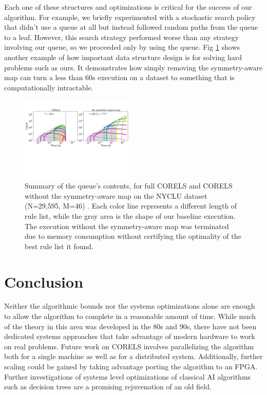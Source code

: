 \documentclass[format=sigconf]{acmart}
\begin{document}
Each one of these structures and optimizations is critical for the success of our algorithm.
For example, we briefly experimented with a stochastic search policy that didn't use a queue at all but instead followed random paths from the queue to a leaf.
However, this search strategy performed worse than any strategy involving our queue, so we proceeded only by using the queue.
Fig \ref{fig:ablation} shows another example of how important data structure design is for solving hard problems such as ours.
It demonstrates how simply removing the symmetry-aware map can turn a less than 60s execution on a dataset to something that is computationally intractable.

\begin{figure}[t!]
\begin{center}
\includegraphics[trim={4mm 0mm 0mm 0mm}, width=0.48\textwidth]{figs/sysml_ablation-queue.pdf}
\end{center}
\vspace{-5mm}
\caption{Summary of the queue's contents, for full CORELS and CORELS without the symmetry-aware map on the NYCLU dataset (N=29,595, M=46)  \citep{nyclu:2014}.
Each color line represents a different length of rule list, while the gray area is the shape of our baseline execution.
The execution without the symmetry-aware map was terminated due to memory consumption without certifying the optimality of the best rule list it found.
}
\label{fig:ablation}
\end{figure}

\section{Conclusion}
Neither the algorithmic bounds nor the systems optimizations alone are enough to allow the algorithm to complete in a reasonable amount of time.
While much of the theory in this area was developed in the 80s and 90s, there have not been dedicated systems approaches that take advantage of modern hardware to work on real problems.
Future work on CORELS involves parallelizing the algorithm both for a single machine as well as for a distributed system.
Additionally, further scaling could be gained by taking advantage porting the algorithm to an FPGA.
Further investigations of systems level optimizations of classical AI algorithms such as decision trees are a promising rejuvenation of an old field.



\end{document}
